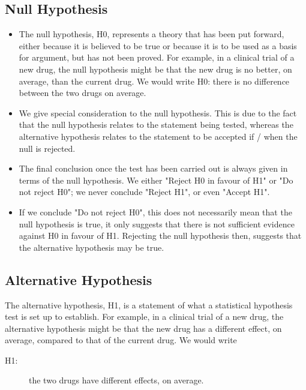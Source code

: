 \documentclass[]{article}
\begin{document}
\subsection{Null Hypothesis}
\begin{itemize}
	\item The null hypothesis, H0, represents a theory that has been put forward, either because it is believed to be true or because it is to be used as a basis for argument, but has not been proved. For example, in a clinical trial of a new drug, the null hypothesis might be that the new drug is no better, on average, than the current drug. We would write H0: there is no difference between the two drugs on average.
	
	\item  We give special consideration to the null hypothesis. This is due to the fact that the null hypothesis relates to the statement being tested, whereas the alternative hypothesis relates to the statement to be accepted if / when the null is rejected.
	
	\item  The final conclusion once the test has been carried out is always given in terms of the null hypothesis. We either "Reject H0 in favour of H1" or "Do not reject H0"; we never conclude "Reject H1", or even "Accept H1".
	
	\item  If we conclude "Do not reject H0", this does not necessarily mean that the null hypothesis is true, it only suggests that there is not sufficient evidence against H0 in favour of H1. Rejecting the null hypothesis then, suggests that the alternative hypothesis may be true.
	
\end{itemize}

\subsection{Alternative Hypothesis}
The alternative hypothesis, H1, is a statement of what a statistical hypothesis test is set up to establish. For example, in a clinical trial of a new drug, the alternative hypothesis might be that the new drug has a different effect, on average, compared to that of the current drug. We would write

\begin{description}
	\item[H1:] the two drugs have different effects, on average.
\end{description}
\end{document}
